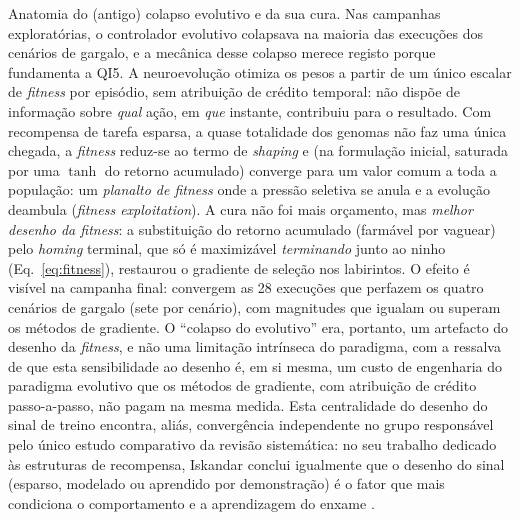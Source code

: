\documentclass[12pt,reqno, twoside]{amsbook}
\makeatletter
\def\paragraph{\@startsection{paragraph}{4}%
  \z@\z@{-\fontdimen2\font}%
  {\normalfont\bfseries}}
\theoremstyle{plain}
\numberwithin{equation}{chapter}
\numberwithin{section}{chapter}
\numberwithin{table}{chapter}
\numberwithin{figure}{chapter}
\makeatother
\begin{document}
\paragraph{Anatomia do (antigo) colapso evolutivo e da sua cura.} Nas campanhas exploratórias, o controlador evolutivo colapsava na maioria das execuções dos cenários de gargalo, e a mecânica desse colapso merece registo porque fundamenta a QI5. A neuroevolução otimiza os pesos a partir de um único escalar de \textit{fitness} por episódio, sem atribuição de crédito temporal: não dispõe de informação sobre \emph{qual} ação, em \emph{que} instante, contribuiu para o resultado. Com recompensa de tarefa esparsa, a quase totalidade dos genomas não faz uma única chegada, a \textit{fitness} reduz-se ao termo de \textit{shaping} e (na formulação inicial, saturada por uma $\tanh$ do retorno acumulado) converge para um valor comum a toda a população: um \emph{planalto de fitness} onde a pressão seletiva se anula e a evolução deambula (\textit{fitness exploitation}). A cura não foi mais orçamento, mas \emph{melhor desenho da \emph{fitness}}: a substituição do retorno acumulado (farmável por vaguear) pelo \textit{homing} terminal, que só é maximizável \emph{terminando} junto ao ninho (Eq.~\ref{eq:fitness}), restaurou o gradiente de seleção nos labirintos. O efeito é visível na campanha final: convergem as 28 execuções que perfazem os quatro cenários de gargalo (sete por cenário), com magnitudes que igualam ou superam os métodos de gradiente. O ``colapso do evolutivo'' era, portanto, um artefacto do desenho da \textit{fitness}, e não uma limitação intrínseca do paradigma, com a ressalva de que esta sensibilidade ao desenho é, em si mesma, um custo de engenharia do paradigma evolutivo que os métodos de gradiente, com atribuição de crédito passo-a-passo, não pagam na mesma medida. Esta centralidade do desenho do sinal de treino encontra, aliás, convergência independente no grupo responsável pelo único estudo comparativo da revisão sistemática: no seu trabalho dedicado às estruturas de recompensa, Iskandar conclui igualmente que o desenho do sinal (esparso, modelado ou aprendido por demonstração) é o fator que mais condiciona o comportamento e a aprendizagem do enxame \cite{iskandar2025phd}.
\end{document}
